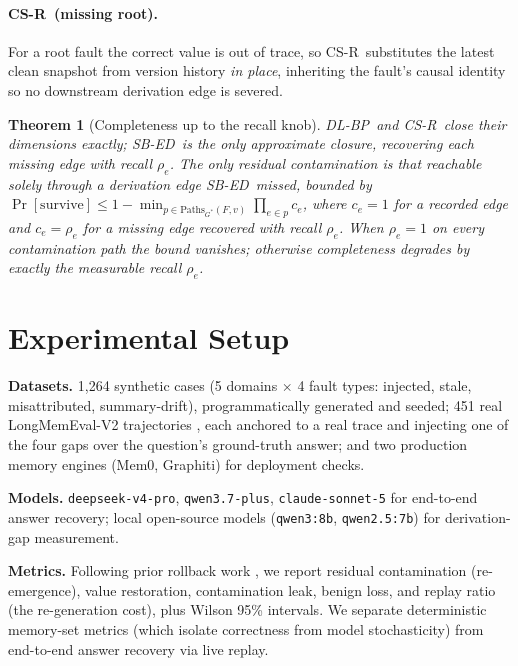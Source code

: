 \documentclass[11pt]{article}
\newtheorem{theorem}{Theorem}
\theoremstyle{remark}
\newcommand{\sbed}{\textsc{SB-ED}}
\newcommand{\dlbp}{\textsc{DL-BP}}
\newcommand{\csr}{\textsc{CS-R}}
\begin{document}
\paragraph{\csr\ (missing root).} For a root fault the correct value is out of trace, so
\csr\ substitutes the latest clean snapshot from version history \emph{in place},
inheriting the fault's causal identity so no downstream derivation edge is severed.

\begin{theorem}[Completeness up to the recall knob]
\label{thm:recall}
\dlbp\ and \csr\ close their dimensions exactly; \sbed\ is the only approximate closure,
recovering each missing edge with recall $\rho_e$. The only residual contamination is
that reachable solely through a derivation edge \sbed\ missed, bounded by
$\Pr[\text{survive}]\le 1-\min_{p\in\mathrm{Paths}_{G^{*}}(F,v)}\prod_{e\in p}c_e$,
where $c_e{=}1$ for a recorded edge and $c_e{=}\rho_e$ for a missing edge recovered with recall $\rho_e$. When $\rho_e{=}1$ on every contamination path the bound vanishes;
otherwise completeness degrades by exactly the measurable recall $\rho_e$.
\end{theorem}

\section{Experimental Setup}
\label{sec:setup}

\textbf{Datasets.} 1{,}264 synthetic cases (5 domains $\times$ 4 fault types:
injected, stale, misattributed, summary-drift), programmatically generated and seeded;
451 real LongMemEval-V2 trajectories \citep{wu2024longmemeval,wu2026longmemeval}, each anchored to a real
trace and injecting one of the four gaps over the question's ground-truth answer; and
two production memory engines (Mem0, Graphiti) for deployment checks.

\textbf{Models.} \texttt{deepseek-v4-pro}, \texttt{qwen3.7-plus},
\texttt{claude-sonnet-5} for end-to-end answer recovery; local open-source models
(\texttt{qwen3:8b}, \texttt{qwen2.5:7b}) for derivation-gap measurement.

\textbf{Metrics.} Following prior rollback work \citep{yu2026dependency}, we report
residual contamination (re-emergence), value restoration, contamination leak,
benign loss, and replay ratio (the re-generation cost), plus Wilson 95\% intervals.
We separate deterministic memory-set metrics (which isolate correctness from model
stochasticity) from end-to-end answer recovery via live replay.
\end{document}
